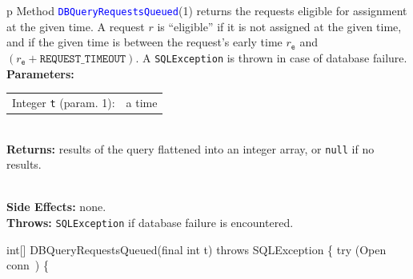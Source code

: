 \begin{tabular}{p{\textwidth}}
\toprule
{}
Method \textcolor{blue}{{\tt{}\protect{}DBQueryRequestsQueued}}(1) returns the requests
eligible for assignment at the given time. A request $r$ is ``eligible'' if it
is not assigned at the given time, and if the given time is between the
request's early time $r_\texttt{e}$ and
$(r_\texttt{e}+\texttt{REQUEST\_TIMEOUT})$.
A {\tt{}SQLException} is thrown in case of database failure.\\
\midrule
\textbf{Parameters:} \\
\begin{tabular}{lp{116mm}}
Integer {\tt{}t} (param. 1):&a time
\end{tabular}\\
\textbf{Returns:} results of the query flattened into an integer array, or
{\tt{}null} if no results.

\\
\textbf{Side Effects:} none.\\
\textbf{Throws:} {\tt{}SQLException} if database failure is encountered.\\
\bottomrule
\end{tabular}
\nwenddocs{}\endmoddef{}
int[] DBQueryRequestsQueued(final int t) throws SQLException \{
  try (\LA{}Open \code{}conn\edoc{}~{\nwtagstyle{}}\RA{}) \{
\eatline
{}\nwendcode{}

